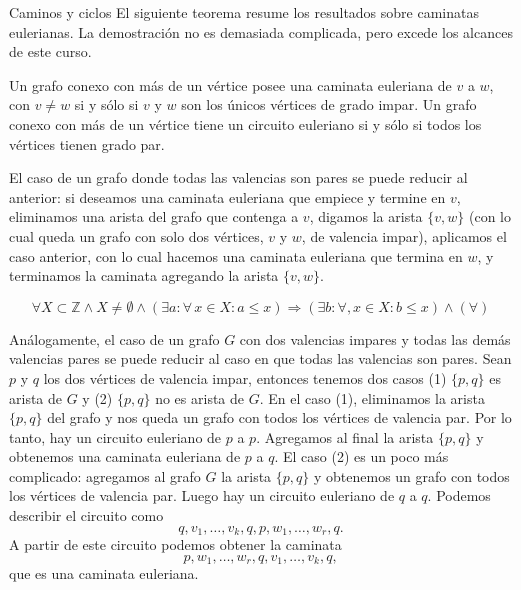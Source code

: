 \begin{section}{Caminos y ciclos}
El siguiente teorema resume los resultados sobre caminatas eulerianas. La demostración no es demasiada complicada, pero excede los alcances de este curso.  

\begin{teorema}\label{th-caminata-euleriana} Un grafo conexo con más de un vértice posee una caminata euleriana de $v$ a $w$, con $v \not= w$ si y sólo si $v$ y $w$ son los únicos vértices de grado impar. Un grafo conexo con más de un vértice tiene un circuito euleriano si y sólo si todos los vértices tienen grado par.
\end{teorema}

\begin{observacion}\label{obs-par-a-impar}
	El caso de un grafo donde todas las valencias son pares se puede reducir al anterior: si deseamos una caminata euleriana que empiece y termine en $v$, eliminamos una arista del grafo que contenga a $v$, digamos la arista $\{v,w\}$ (con lo cual queda un grafo  con solo dos vértices, $v$ y $w$, de valencia impar), aplicamos el caso  anterior, con lo cual hacemos una caminata euleriana que termina en  $w$, y terminamos la caminata agregando  la arista $\{v,w\}$. 
\end{observacion}

$$
\forall X \subset \mathbb Z \wedge X \ne \emptyset \wedge (\exists a: \forall\, x \in X: a \le x) \Rightarrow (\exists b: \forall, x \in X :b \le x) \wedge (\forall)
$$
\begin{observacion}\label{obs-impar-a-par}
	Análogamente,  el caso de un grafo  $G$ con dos valencias impares y todas las demás valencias pares  se puede reducir al caso en que todas las valencias son pares. Sean $p$ y $q$ los dos vértices de valencia impar,  entonces tenemos dos casos (1) $\{p,q\}$  es arista de $G$ y (2) $\{p,q\}$  no es arista de $G$.  En el caso (1),  eliminamos la arista  $\{p,q\}$  del grafo  y  nos queda un grafo  con todos los vértices de valencia par. Por lo tanto, hay un circuito euleriano de $p$  a $p$. Agregamos al final la arista $\{p,q\}$  y obtenemos una caminata euleriana de  $p$ a $q$. El caso (2) es un poco más complicado: agregamos al grafo $G$ la arista $\{p,q\}$ y obtenemos un grafo  con todos los vértices de valencia par. Luego  hay un circuito euleriano de $q$ a $q$. Podemos describir el circuito como
	$$
	q,v_1,\ldots,v_k,q,p,w_1,\ldots,w_r,q.
	$$
	A partir de este circuito podemos obtener la caminata
	$$
	p,w_1,\ldots,w_r,q,v_1,\ldots,v_k,q, 
	$$
	que es una caminata euleriana. 
\end{observacion}



\end{section}
